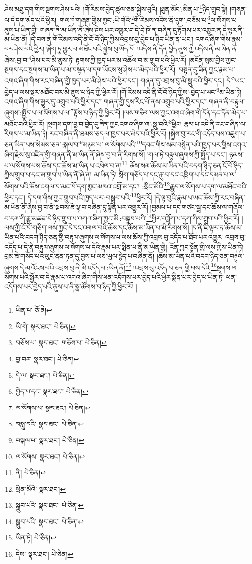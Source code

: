 ཤེས་མཐུ་དག་གིས་སྔགས་ཤེས་པའི། །གོ་རིམས་བྱེད་ཚུལ་ཅན་སྐྱེས་བུའི། །ཐུན་མོང་:མིན་པ་\footnote{ཡིན་པ་  ཅོ་ནེ། }ཉིད་གྲུབ་སྟེ། །གཞན་ལ་དེ་དག་མེད་པའི་ཕྱིར། །གལ་ཏེ་གཞན་གྱིས་ཀྱང་:ཡི་གེའི་\footnote{ཡི་གེ་  སྣར་ཐང་།  པེ་ཅིན། }གོ་རིམས་འདིས་ནི་དུག་:བཅོམ་པ་\footnote{བཅོས་པ་  སྣར་ཐང་། གཅོས་པ་  པེ་ཅིན། }ལ་སོགས་པ་ནུས་པ་ཡིན་གྱི། གཞན་ནི་མ་ཡིན་ནོ་ཞེས་ཤེས་པར་འགྱུར་བ་དེ་དེ་ཁོ་ན་བཞིན་དུ་རྟོགས་པར་འགྱུར་ན་དེ་ལྟར་ནི་མ་ཡིན་ནོ། །དེ་བས་ན་གོ་རིམས་འདི་ནི་ངོ་བོ་ཉིད་ཀྱིས་འབྲས་བུ་བྱེད་པ་ཉིད་ཡིན་ན་ཡང་། འགའ་ཞིག་གིས་རྣམ་པར་ཤེས་པའི་ཕྱིར། ལྐོག་ཏུ་གྱུར་པ་མཐོང་བའི་སྐྱེས་བུ་ཡོད་དོ། །འདིས་ནི་དོན་བྱེད་ནུས་ཀྱི་འདིས་ནི་མ་ཡིན་ནོ་ཞེས་:བྱ་བ་\footnote{བྱ་བར་  སྣར་ཐང་།  པེ་ཅིན། }ཤེས་པར་མི་ནུས་ཏེ། རྟགས་ཀྱི་ཁྱད་པར་མ་འཆོལ་བ་མ་གྲུབ་པའི་ཕྱིར་རོ། །མངོན་སུམ་གྱིས་ཀྱང་སྔགས་དང་སྔགས་མ་ཡིན་པ་མ་བསྟན་པ་དག་ཡོངས་སུ་ཤེས་པ་མེད་པའི་ཕྱིར་རོ། །བསྟན་དུ་ཟིན་ཀྱང་རྣམ་པ་འགའ་ཞིག་གིས་རང་བཞིན་གྱི་ཁྱད་པར་མི་ཤེས་པའི་ཕྱིར་དང་། གཞན་དུ་འབྲས་བུ་མི་སླུ་བའི་ཕྱིར་དང་། དེ་\footnote{དེ་ལ་  སྣར་ཐང་།  པེ་ཅིན། }ཡང་བྱེད་པ་ལས་སྔར་མཐོང་བར་མི་ནུས་པ་ཉིད་ཀྱི་ཕྱིར་རོ། །གོ་རིམས་འདི་ནི་ངོ་བོ་ཉིད་ཀྱིས་:བྱེད་པ་ཡང་\footnote{བྱེད་པ་དང་  སྣར་ཐང་།  པེ་ཅིན། }མ་ཡིན་ཏེ། འགའ་ཞིག་གིས་མྱུར་དུ་འགྲུབ་པའི་ཕྱིར་དང་། གཞན་གྱི་དུས་རིང་པོ་ནས་འགྲུབ་པའི་ཕྱིར་དང་། གཞན་ནི་བརྟུལ་ཞུགས་:སྤྱོད་པ་ལ་སོགས་པ་ལ་\footnote{ལ་སོགས་པ་  སྣར་ཐང་།  པེ་ཅིན། }ལྟོས་པ་ཉིད་ཀྱི་ཕྱིར་རོ། །ལས་གཅིག་ལས་ཀྱང་འགའ་ཞིག་གི་དོན་དང་དོན་མེད་པ་མཐོང་བའི་ཕྱིར་རོ། །སྔགས་དག་བྱ་བ་བྱེད་དུ་ཟིན་ཀྱང་འགའ་ཞིག་ལ་:སླུ་བའི་\footnote{བསླུ་བའི་  སྣར་ཐང་།  པེ་ཅིན། }ཕྱིར། རྣམ་པ་འདི་ནི་རང་བཞིན་ལ་རིགས་པ་མ་ཡིན་ཏེ། རང་བཞིན་ནི་ཐམས་ཅད་ལ་ཁྱད་པར་མེད་པའི་ཕྱིར་རོ། །སྐྱེས་བུ་རང་གི་འདོད་པས་འཇུག་པ་ཅན་ཡིན་པས་སེམས་ཅན་:སྐལ་བ་\footnote{བསྐལ་པ་  སྣར་ཐང་།  པེ་ཅིན། }མཉམ་པ་:ལ་སོགས་པའི་\footnote{ལ་སོགས་  སྣར་ཐང་།  པེ་ཅིན། }དབང་གིས་སམ་བསྙེན་པའི་ཁྱད་པར་གྱིས་འགའ་ཞིག་རྗེས་སུ་འཛིན་གྱི་གཞན་ནི་མ་ཡིན་ནོ་ཞེས་བྱ་བ་ནི་རིགས་སོ། །གལ་ཏེ་བརྟུལ་ཞུགས་ཀྱི་སྤྱོད་པ་དང་། ཉམས་པ་ལ་སོགས་པས་ཆོས་དང་ཆོས་མ་ཡིན་པ་འཕེལ་བ་ན།\footnote{ནི།  པེ་ཅིན། } ཆོས་སམ་ཆོས་མ་ཡིན་པའི་བདག་ཉིད་ཅན་ངོ་བོ་ཉིད་ཀྱིས་གྲུབ་པ་དང་མ་གྲུབ་པ་ཡིན་ནོ་ཞེ་ན། མ་ཡིན་ཏེ། སྲོག་གཅོད་པ་དང་རྐུ་བ་དང་འཁྲིག་པ་དང་དམན་པ་ལ་སོགས་པའི་ཆོས་འགལ་བ་མང་པོ་དག་ཀྱང་མཁའ་འགྲོ་མ་དང་། :སྲིང་མོའི་\footnote{སྲིན་མོའི་  སྣར་ཐང་། }རྒྱུད་ལ་སོགས་པ་དག་ལ་མཐོང་བའི་ཕྱིར་དང་། དེ་དག་གིས་ཀྱང་གྲུབ་པའི་ཁྱད་པར་:བསྒྲུབ་པའི་\footnote{སྒྲུབ་པའི་  སྣར་ཐང་།  པེ་ཅིན། }ཕྱིར་རོ། །དེ་ལྟ་བུའི་རྣམ་པ་ཡང་ཆོས་ཀྱི་རང་བཞིན་མ་ཡིན་ནོ་ཞེས་བྱ་བ་ནི་སྐབས་ཇི་ལྟ་བ་བཞིན་དུ་སྟོན་པར་འགྱུར་རོ། །བྱམས་པ་དང་གཙང་སྦྲ་དང་ཆོས་ལ་གཞོལ་བ་དག་གི་རྒྱུ་མཚན་དེ་ཉིད་གྲུབ་པ་འགའ་ཞིག་ཀྱང་མི་:བསྒྲུབ་པའི་\footnote{སྒྲུབ་པའི་  སྣར་ཐང་།  པེ་ཅིན། }ཕྱིར་བཟློག་པ་དག་གིས་གྲུབ་པའི་ཕྱིར་རོ། །ལས་ཀྱི་ངོ་བོ་གཅིག་ལས་ཀྱང་དེ་དང་འགལ་བའི་ཆོས་དང་ཆོས་མ་ཡིན་པ་མི་རིགས་སོ། །ད་ནི་ཇི་ལྟར་ན་ཆོས་མ་ཡིན་པའི་བདག་ཉིད་ཅན་གྱི་བརྟུལ་ཞུགས་ལ་སོགས་པ་ལས་ཆོས་ཀྱི་འབྲས་བུ་འདོད་པ་ཐོབ་པར་འགྱུར། འབྲས་བུ་འདོད་པ་དེ་ནི་བརྟུལ་ཞུགས་ལ་སོགས་པ་དེའི་རྣམ་པར་སྨིན་པ་ནི་མ་ཡིན་གྱི། འོན་ཀྱང་སྔོན་གྱི་ལས་ཀྱིས་ཡིན་ཏེ། བྲམ་ཟེ་གསོད་པའི་ལུང་ནན་ཏན་དུ་བྱས་པ་ལས་ཡུལ་རྙེད་པ་བཞིན་ནོ། །ཆོས་མ་ཡིན་པའི་བདག་ཉིད་ཅན་བརྟུལ་ཞུགས་དེ་མ་འོངས་པའི་འབྲས་བུ་ནི་མི་འདོད་པ་:ཡིན་ནོ།\footnote{ཡིན་ཏེ།  པེ་ཅིན། } །འབྲས་བུ་འདོད་པ་ཅན་གྱི་ལས་དེའི་\footnote{དེས་  སྣར་ཐང་།  པེ་ཅིན། }སྔགས་ལ་སོགས་པའི་སྦྱོར་བ་དེ་རྣམ་པ་འགའ་ཞིག་གིས་ཕན་འདོགས་པར་བྱེད་པའི་ཕྱིར་སྨིན་པར་བྱེད་པ་ཡིན་ཏེ། ཕན་འདོགས་པར་བྱེད་པའི་ནུས་པ་ནི་སྣ་ཚོགས་བ་ཉིད་ཀྱི་ཕྱིར་རོ། །

